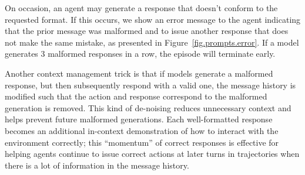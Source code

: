 On occasion, an agent may generate a response that doesn't conform to the requested format.
If this occurs, we show an error message to the agent indicating that the prior message was malformed and to issue another response that does not make the same mistake, as presented in Figure~\ref{fig.prompts.error}.
If a model generates \num{3} malformed responses in a row, the episode will terminate early.



Another context management trick is that if models generate a malformed response, but then subsequently respond with a valid one, the message history is modified such that the action and response correspond to the malformed generation is removed.
This kind of de-noising reduces unnecessary context and helps prevent future malformed generations.
Each well-formatted response becomes an additional in-context demonstration of how to interact with the environment correctly; this ``momentum'' of correct responses is effective for helping agents continue to issue correct actions at later turns in trajectories when there is a lot of information in the message history.